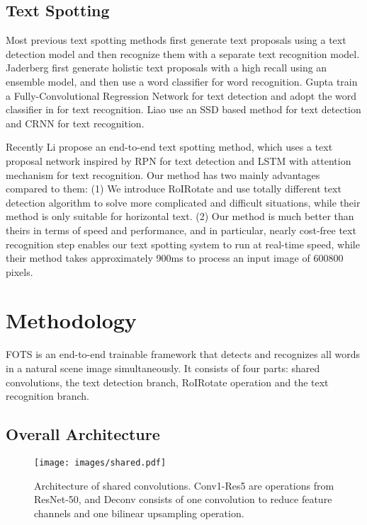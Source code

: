 \documentclass[10pt,twocolumn,letterpaper]{article}
\begin{document}
\subsection{Text Spotting}
Most previous text spotting methods first generate text proposals using a text detection model and then recognize them with a separate text recognition model. Jaderberg \etal \cite{jaderberg2016ijcv} first generate holistic text proposals with a high recall using an ensemble model, and then use a word classifier for word recognition. Gupta \etal \cite{gupta2016synthetic} train a Fully-Convolutional Regression Network for text detection and adopt the word classifier in \cite{jaderberg2014synthetic} for text recognition. Liao \etal \cite{liao2017textboxes} use an SSD \cite{liu2016ssd} based method for text detection and CRNN \cite{shi2016crnn} for text recognition.

Recently Li \etal \cite{li2017iccv} propose an end-to-end text spotting method, which uses a text proposal network inspired by RPN \cite{ren2015faster} for text detection and LSTM with attention mechanism \cite{luong2015effective,shi2016robust,Chen2004Detecting} for text recognition. Our method has two mainly advantages compared to them: (1) We introduce RoIRotate and use totally different text detection algorithm to solve more complicated and difficult situations, while their method is only suitable for horizontal text. (2) Our method is much better than theirs in terms of speed and performance, and in particular, nearly cost-free text recognition step enables our text spotting system to run at real-time speed, while their method takes approximately 900ms to process an input image of 600800 pixels.


\section{Methodology}
FOTS is an end-to-end trainable framework that detects and recognizes all words in a natural scene image simultaneously. It consists of four parts: shared convolutions, the text detection branch, RoIRotate operation and the text recognition branch.

\subsection{Overall Architecture}
\label{overall}

\begin{figure}
\texttt{[image: images/shared.pdf]}
\vspace{5pt}
\caption{Architecture of shared convolutions. Conv1-Res5 are operations from ResNet-50, and Deconv consists of one convolution to reduce feature channels and one bilinear upsampling operation.}
\label{fig:shared}
\end{figure}
\end{document}

